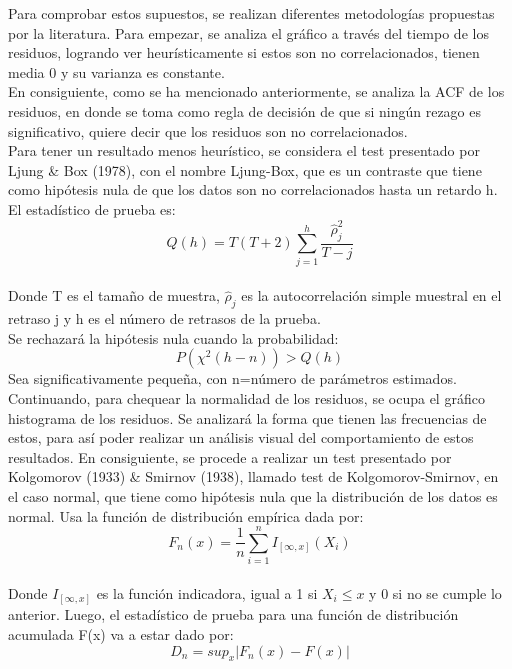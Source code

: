 \documentclass{report}
\begin{document}
Para comprobar estos supuestos, se realizan diferentes metodologías propuestas por la literatura. Para empezar, se analiza el gráfico a través del tiempo de los residuos, logrando ver heurísticamente si estos son no correlacionados, tienen media 0 y su varianza es constante.\\

En consiguiente, como se ha mencionado anteriormente, se analiza la ACF de los residuos, en donde se toma como regla de decisión de que si ningún rezago es significativo, quiere decir que los residuos son no correlacionados.\\

Para tener un resultado menos heurístico, se considera el test presentado por Ljung \& Box (1978), con el nombre Ljung-Box, que es un contraste que tiene como hipótesis nula de que los datos son no correlacionados hasta un retardo h. El estadístico de prueba es:\\
    \begin{equation}
        Q(h)=T(T+2)\sum_{j=1}^{h}\frac{\hat{\rho}_{j}^{2}}{T-j}
    \end{equation}\\
    \vspace{0.5cm}
    Donde T es el tamaño de muestra, $\hat{\rho}_{j}$ es la autocorrelación simple muestral en el retraso j y h es el número de retrasos de la prueba.\\
    
    Se rechazará la hipótesis nula cuando la probabilidad:\\
    $$P(\chi^{2}(h-n))>Q(h)$$
    Sea significativamente pequeña, con n=número de parámetros estimados.\\

Continuando, para chequear la normalidad de los residuos, se ocupa el gráfico histograma de los residuos. Se analizará la forma que tienen las frecuencias de estos, para así poder realizar un análisis visual del comportamiento de estos resultados. En consiguiente, se procede a realizar un test presentado por Kolgomorov (1933) \& Smirnov (1938), llamado test de Kolgomorov-Smirnov, en el caso normal, que tiene como hipótesis nula que la distribución de los datos es normal. Usa la función de distribución empírica dada por:\\
    \begin{equation}
       F_{n}(x)=\frac{1}{n}\sum_{i=1}^{n}I_{[\infty,x]}(X_{i})
    \end{equation}\\
    \vspace{0.5cm}
    Donde $I_{[\infty,x]}$ es la función indicadora, igual a 1 si $X_{i} \leq x$ y 0 si no se cumple lo anterior. Luego, el estadístico de prueba para una función de distribución acumulada F(x) va a estar dado por:\\
    \begin{equation}
        D_{n}=sup_{x}|F_{n}(x)-F(x)|
    \end{equation}\\
    
\end{document}
